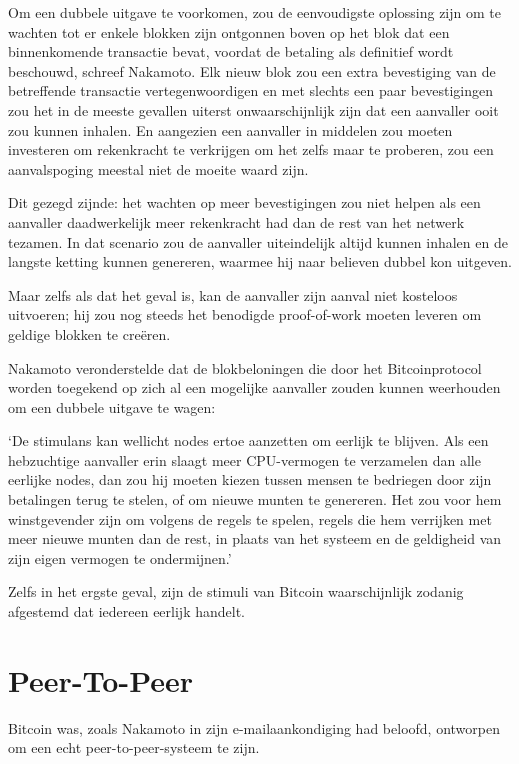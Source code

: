 \documentclass[
  a5paper,
  smalldemyvopaper,11pt,twoside,onecolumn,openright,extrafontsizes,
hidelinks]{memoir}
\renewenvironment{quote}%
               {\list{}{\rightmargin=.3cm\leftmargin=.3cm}%
                \itshape \item[]}%
               {\endlist}
\begin{document}
Om een dubbele uitgave te voorkomen, zou de eenvoudigste oplossing zijn
om te wachten tot er enkele blokken zijn ontgonnen boven op het blok dat
een binnenkomende transactie bevat, voordat de betaling als definitief
wordt beschouwd, schreef Nakamoto. Elk nieuw blok zou een extra
bevestiging van de betreffende transactie vertegenwoordigen en met
slechts een paar bevestigingen zou het in de meeste gevallen uiterst
onwaarschijnlijk zijn dat een aanvaller ooit zou kunnen inhalen. En
aangezien een aanvaller in middelen zou moeten investeren om rekenkracht
te verkrijgen om het zelfs maar te proberen, zou een aanvalspoging
meestal niet de moeite waard zijn.

Dit gezegd zijnde: het wachten op meer bevestigingen zou niet helpen als
een aanvaller daadwerkelijk meer rekenkracht had dan de rest van het
netwerk tezamen. In dat scenario zou de aanvaller uiteindelijk altijd
kunnen inhalen en de langste ketting kunnen genereren, waarmee hij naar
believen dubbel kon uitgeven.

Maar zelfs als dat het geval is, kan de aanvaller zijn aanval niet
kosteloos uitvoeren; hij zou nog steeds het benodigde proof-of-work
moeten leveren om geldige blokken te creëren.

Nakamoto veronderstelde dat de blokbeloningen die door het
Bitcoinprotocol worden toegekend op zich al een mogelijke aanvaller
zouden kunnen weerhouden om een dubbele uitgave te wagen:

\begin{quote}
`De stimulans kan wellicht nodes ertoe aanzetten om eerlijk te blijven.
Als een hebzuchtige aanvaller erin slaagt meer CPU-vermogen te
verzamelen dan alle eerlijke nodes, dan zou hij moeten kiezen tussen
mensen te bedriegen door zijn betalingen terug te stelen, of om nieuwe
munten te genereren. Het zou voor hem winstgevender zijn om volgens de
regels te spelen, regels die hem verrijken met meer nieuwe munten dan de
rest, in plaats van het systeem en de geldigheid van zijn eigen vermogen
te ondermijnen.'
\end{quote}

Zelfs in het ergste geval, zijn de stimuli van Bitcoin waarschijnlijk
zodanig afgestemd dat iedereen eerlijk handelt.

\section{Peer-To-Peer}\label{peer-to-peer}

Bitcoin was, zoals Nakamoto in zijn e-mailaankondiging had beloofd,
ontworpen om een echt peer-to-peer-systeem te zijn.
\end{document}
